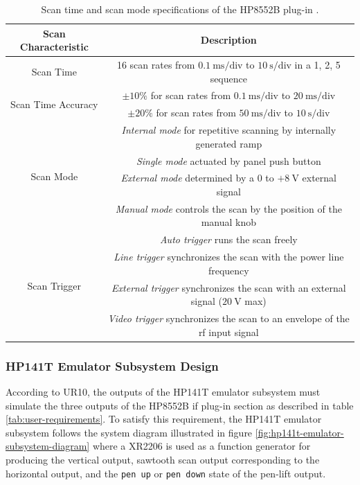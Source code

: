 \documentclass[class=report,11pt,crop=false]{standalone}
\begin{document}
	\begin{table}[ht!]
		\centering
		\label{tab:scan-specifications}
		\begin{tabular}{|c|c|}
			\hline
			\textbf{Scan Characteristic}	& \textbf{Description} \\
			\hline
			Scan Time	& 16 scan rates from $\SI{0.1}{\milli\second}/\text{div}$ to $\SI{10}{\second}/\text{div}$ in a 1, 2, 5 sequence\\
			\hline
			\multirow{2}{*}{Scan Time Accuracy} & $\pm10\%$ for scan rates from $\SI{0.1}{\milli\second}/\text{div}$ to $\SI{20}{\milli\second}/\text{div}$\\
			\cline{2-2}
												& $\pm20\%$ for scan rates from $\SI{50}{\milli\second}/\text{div}$ to $\SI{10}{\second}/\text{div}$\\
			\hline
			\multirow{4}{*}{Scan Mode}	& \textit{Internal mode} for repetitive scanning by internally generated ramp	\\
			\cline{2-2}
										& \textit{Single mode} actuated by panel push button\\
			\cline{2-2}
										& \textit{External mode} determined by a $0$ to $+\SI{8}{\volt}$ external signal\\
			\cline{2-2}
										& \textit{Manual mode} controls the scan by the position of the manual knob\\
			\hline
			\multirow{4}{*}{Scan Trigger}	& \textit{Auto trigger} runs the scan freely\\
			\cline{2-2}
											&  \textit{Line trigger} synchronizes the scan with the power line frequency\\
			\cline{2-2}
											& \textit{External trigger} synchronizes the scan with an external signal ($\SI{20}{\volt}$ max) \\
			\cline{2-2}
											& \textit{Video trigger} synchronizes the scan to an envelope of the \acrshort{rf} input signal\\ 
			\hline
		\end{tabular}
		\caption{Scan time and scan mode specifications of the HP8552B plug-in \cite{hp8552b}.}
	\end{table}
		
	\subsubsection{HP141T Emulator Subsystem Design}
	
	According to UR10, the outputs of the HP141T emulator subsystem must simulate the three outputs of the HP8552B \acrshort{if} plug-in section as described in table \ref{tab:user-requirements}. To satisfy this requirement, the HP141T emulator subsystem follows the system diagram illustrated in figure \ref{fig:hp141t-emulator-subsystem-diagram} where a XR2206 is used as a function generator for producing the vertical output, sawtooth scan output corresponding to the horizontal output, and the \texttt{pen up} or \texttt{pen down} state of the pen-lift output. 
	
\end{document}
